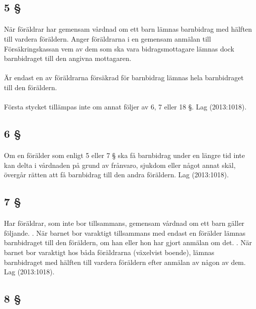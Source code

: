 \documentclass[a4paper,notitlepage,openany,10pt]{book}
\begin{document}
\subsection*{5 §}
\paragraph*{}
När föräldrar har gemensam vårdnad om ett barn lämnas barnbidrag med hälften till vardera föräldern. Anger föräldrarna i en gemensam anmälan till Försäkringskassan vem av dem som ska vara bidragsmottagare lämnas dock barnbidraget till den angivna mottagaren.
\paragraph*{}
Är endast en av föräldrarna försäkrad för barnbidrag lämnas hela barnbidraget till den föräldern.
\paragraph*{}
Första stycket tillämpas inte om annat följer av 6, 7 eller 18 §.
Lag (2013:1018).
\subsection*{6 §}
\paragraph*{}
Om en förälder som enligt 5 eller 7 § ska få barnbidrag under en längre tid inte kan delta i vårdnaden på grund av frånvaro, sjukdom eller något annat skäl, övergår rätten att få barnbidrag till den andra föräldern.
Lag (2013:1018).
\subsection*{7 §}
\paragraph*{}
Har föräldrar, som inte bor tillsammans, gemensam vårdnad om ett barn gäller följande.
. När barnet bor varaktigt tillsammans med endast en förälder lämnas barnbidraget till den föräldern, om han eller hon har gjort anmälan om det.
. När barnet bor varaktigt hos båda föräldrarna (växelvist boende), lämnas barnbidraget med hälften till vardera föräldern efter anmälan av någon av dem.
Lag (2013:1018).
\subsection*{8 §}
\end{document}
